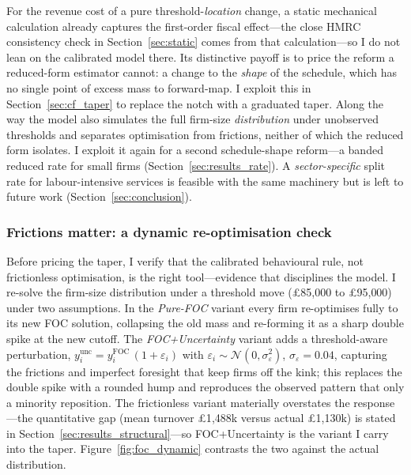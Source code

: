 For the revenue cost of a pure threshold-\emph{location} change, a static
mechanical calculation already captures the first-order fiscal effect---the close
HMRC consistency check in Section~\ref{sec:static} comes from that
calculation---so I do not lean on the calibrated model there. Its distinctive
payoff is to price the reform a reduced-form estimator cannot: a change to the
\emph{shape} of the schedule, which has no single point of excess mass to
forward-map. I exploit this in Section~\ref{sec:cf_taper} to replace the notch
with a graduated taper. Along the way the model also simulates the full firm-size
\emph{distribution} under unobserved thresholds and separates optimisation from
frictions, neither of which the reduced form isolates. I exploit it again for a
second schedule-shape reform---a banded reduced rate for small firms
(Section~\ref{sec:results_rate}). A \emph{sector-specific} split rate for
labour-intensive services is feasible with the same machinery but is left to future
work (Section~\ref{sec:conclusion}).

\subsubsection{Frictions matter: a dynamic re-optimisation check}
\label{sec:cf_dynamic}

Before pricing the taper, I verify that the calibrated behavioural rule, not
frictionless optimisation, is the right tool---evidence that disciplines the
model. I re-solve the firm-size distribution under a threshold move
(\pounds85{,}000 to \pounds95{,}000) under two assumptions. In the
\emph{Pure-FOC} variant every firm re-optimises fully to its new FOC solution,
collapsing the old mass and re-forming it as a sharp double spike at the new
cutoff. The \emph{FOC+Uncertainty} variant adds a threshold-aware perturbation,
$y^{\text{unc}}_i = y^{\text{FOC}}_i\,(1+\varepsilon_i)$ with
$\varepsilon_i \sim \mathcal{N}(0, \sigma_\varepsilon^{2})$,
$\sigma_\varepsilon = 0.04$, capturing the frictions and imperfect foresight that
keep firms off the kink; this replaces the double spike with a rounded hump and
reproduces the observed pattern that only a minority reposition. The frictionless
variant materially overstates the response---the quantitative gap (mean turnover
\pounds1{,}488k versus actual \pounds1{,}130k) is stated in
Section~\ref{sec:results_structural}---so FOC+Uncertainty is the variant I carry
into the taper. Figure~\ref{fig:foc_dynamic} contrasts the two against the actual
distribution.

